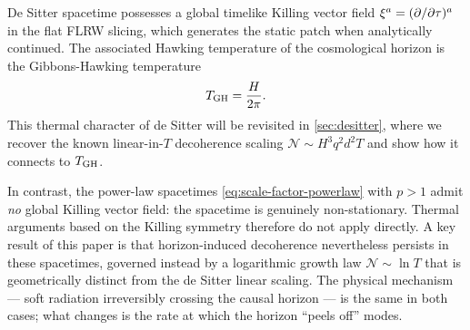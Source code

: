 De Sitter spacetime possesses a global timelike Killing vector field
$\xi^{a} = (\partial/\partial\tau)^{a}$ in the flat FLRW slicing, which generates the
static patch when analytically continued.  The associated Hawking temperature
of the cosmological horizon is the Gibbons-Hawking temperature
\cite{Gibbons:1977mu}
%
\begin{equation}
  T_{\rm GH} = \frac{H}{2\pi} .
  \label{eq:gibbons-hawking}
\end{equation}
%
This thermal character of de Sitter will be revisited in
\cref{sec:desitter}, where we recover the known linear-in-$T$ decoherence
scaling $\mathcal{N} \sim H^{3}q^{2}d^{2}T$ \cite{Danielson:2022tdw} and
show how it connects to $T_{\rm GH}$.

In contrast, the power-law spacetimes \cref{eq:scale-factor-powerlaw} with
$p > 1$ admit \emph{no} global Killing vector field: the spacetime is
genuinely non-stationary.  Thermal arguments based on the Killing symmetry
therefore do not apply directly.  A key result of this paper is that
horizon-induced decoherence nevertheless persists in these spacetimes,
governed instead by a logarithmic growth law $\mathcal{N} \sim \ln T$
that is geometrically distinct from the de Sitter linear scaling.  The
physical mechanism — soft radiation irreversibly crossing the causal
horizon — is the same in both cases; what changes is the rate at which the
horizon ``peels off'' modes.
